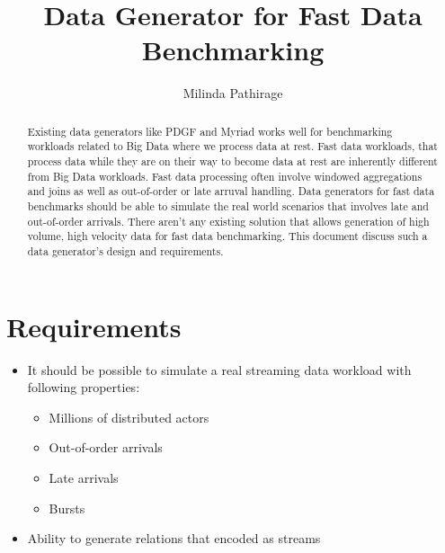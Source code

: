 \documentclass{thesis}
\title{Data Generator for Fast Data Benchmarking}
\author{Milinda Pathirage}
\begin{document}
\maketitle


\begin{abstract}
Existing data generators like PDGF and Myriad works well for benchmarking workloads related to Big Data where we process data at rest. Fast data workloads, that process data while they are on their way to become data at rest are inherently different from Big Data workloads. Fast data processing often involve windowed aggregations and joins as well as out-of-order or late arruval handling. Data generators for fast data benchmarks should be able to simulate the real world scenarios that involves late and out-of-order arrivals. There aren't any existing solution that allows generation of high volume, high velocity data for fast data benchmarking. This document discuss such a data generator's design and requirements.
\end{abstract}

\section{Requirements}

\begin{itemize}
	\item It should be possible to simulate a real streaming data workload with following properties:
	\begin{itemize}
	 	\item Millions of distributed actors
	 	\item Out-of-order arrivals
	 	\item Late arrivals
	 	\item Bursts
	 \end{itemize} 
	\item Ability to generate relations that encoded as streams
\end{itemize}






\end{document}
